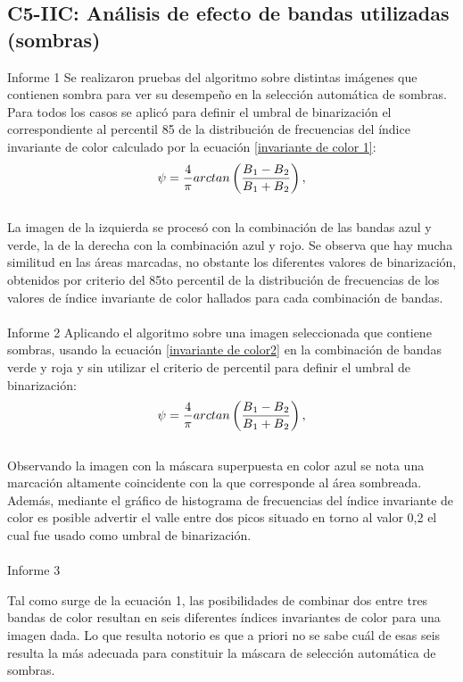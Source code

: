 \subsection{C5-IIC: Análisis de efecto de bandas utilizadas (sombras)}
Informe 1
Se realizaron pruebas del algoritmo sobre distintas imágenes que contienen sombra para ver su desempeño en la selección automática de sombras. Para todos los casos se aplicó para definir el umbral de binarización el correspondiente al percentil 85 de la distribución de frecuencias del índice invariante de color calculado por la ecuación \ref{invariante de color 1}:
\\
\begin{equation}
	\psi=\frac{4}{\pi} arctan\left(\frac{B\textsubscript{1}-B\textsubscript{2}}{B\textsubscript{1}+B\textsubscript{2}}\right),\label{invariante de color 1}
\end{equation}
\\
La imagen de la izquierda se procesó con la combinación de las bandas azul y verde, la de la derecha con la combinación azul y rojo.
Se observa que hay mucha similitud en las áreas marcadas, no obstante los diferentes valores de binarización, obtenidos por criterio del 85to percentil de la distribución de frecuencias de los valores de índice invariante de color hallados para cada combinación de bandas.
\\
\\
Informe 2
Aplicando el algoritmo sobre una imagen seleccionada que contiene sombras, usando la ecuación \ref{invariante de color2} en la combinación de bandas verde y roja y sin utilizar el criterio de percentil para definir el umbral de binarización:
\\
\begin{equation}
	\psi=\frac{4}{\pi} arctan\left(\frac{B\textsubscript{1}-B\textsubscript{2}}{B\textsubscript{1}+B\textsubscript{2}}\right),\label{invariante de color2}
\end{equation}
\\
Observando la imagen con la máscara superpuesta en color azul se nota una marcación altamente coincidente con la que corresponde al área sombreada. Además, mediante el gráfico de histograma de frecuencias del índice invariante de color es posible advertir el valle entre dos picos situado en torno al valor 0,2 el cual fue usado como umbral de binarización.
\\
\\
Informe 3

Tal como surge de la ecuación 1, las posibilidades de combinar dos entre tres bandas de color resultan en seis diferentes índices invariantes de color para una imagen dada. Lo que resulta notorio es que a priori no se sabe cuál de esas seis resulta la más adecuada para constituir la máscara de selección automática de sombras. 
\color{black}
